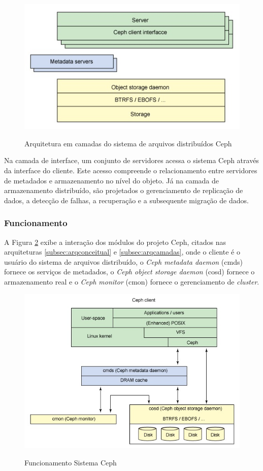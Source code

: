     \begin{figure}[htb]
    \centering
    \includegraphics[scale=0.90]{imagens/arquiteturaCeph2.jpg}
    \caption{Arquitetura em camadas do sistema de arquivos distribuídos Ceph} \cite[p. 3]{jones}
    \label{fig:arquiteturaceph2}
    \end{figure}
    
    Na camada de interface, um conjunto de servidores acessa o sistema Ceph através da interface do cliente. Este acesso compreende o relacionamento entre servidores de metadados e armazenamento no nível do objeto. Já na camada de armazenamento distribuído, são projetados o gerenciamento de replicação de dados, a detecção de falhas, a recuperação e a subsequente migração de dados.
    

\subsubsection{Funcionamento}
    A Figura \ref{fig:sistemaceph} exibe a interação dos módulos do projeto Ceph, citados nas arquiteturas \ref{subsec:arqconceitual} e \ref{subsec:arqcamadas}, onde o cliente é o usuário do sistema de arquivos distribuído, o \textit{Ceph metadata daemon} (cmds) fornece os serviços de metadados, o \textit{Ceph object storage daemon} (cosd) fornece o armazenamento real e o \textit{Ceph monitor} (cmon) fornece o gerenciamento de \textit{cluster}. 

    \begin{figure}[htb]
    \centering
    \includegraphics[scale=0.90]{imagens/sistemaCeph.jpg}
    \caption{Funcionamento Sistema Ceph} \cite[p. 4]{jones}
    \label{fig:sistemaceph}
    \end{figure}

